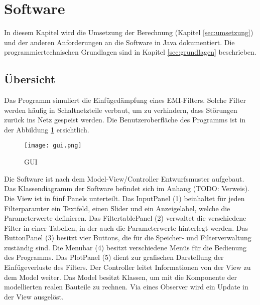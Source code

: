 
\section{Software} \label{sec:software}
In diesem Kapitel wird die Umsetzung der Berechnung (Kapitel \ref{sec:umsetzung}) und der anderen Anforderungen an die Software in Java dokumentiert. Die programmiertechnischen Grundlagen sind in Kapitel \ref{sec:grundlagen} beschrieben.
\subsection{Übersicht} \label{subsec:uebersicht}

Das Programm simuliert die Einfügedämpfung eines EMI-Filters. Solche Filter werden häufig in Schaltnetzteile verbaut, um zu verhindern, dass Störungen zurück ins Netz gespeist werden.  Die Benutzeroberfläche des Programms ist in der Abbildung \ref{fig:GUI} ersichtlich.

\begin{figure}[H]
	\centering
	\texttt{[image: gui.png]}
	\caption{GUI}
	\label{fig:GUI}
\end{figure} 

Die Software ist nach dem Model-View/Controller Entwurfsmuster \cite{MVCDesignPattern} aufgebaut. Das Klassendiagramm der Software befindet sich im Anhang (TODO: Verweis).  Die View ist in fünf Panels unterteilt. Das InputPanel (1) beinhaltet für jeden Filterparamter ein Textfeld, einen Slider und ein Anzeigelabel, welche die Parameterwerte definieren. Das  FiltertablePanel (2) verwaltet die verschiedene Filter in einer Tabellen, in der auch die Parameterwerte hinterlegt werden. Das ButtonPanel (3) besitzt vier Buttons, die für die Speicher- und Filterverwaltung zuständig sind. Die Menubar (4) besitzt verschiedene Menüs für die Bedienung des Programms. Das PlotPanel (5) dient zur grafischen Darstellung der Einfügeverluste des Filters. Der Controller leitet Informationen von der View zu dem Model weiter. Das Model besitzt Klassen, um mit die Komponente der modellierten realen Bauteile zu rechnen. Via eines Observer wird ein Update in der View ausgelöst.

\newpage







